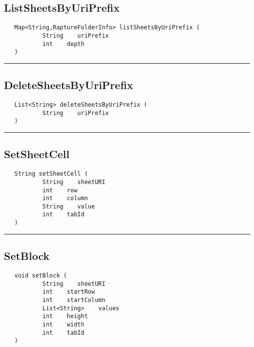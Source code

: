 \subsection{ListSheetsByUriPrefix}
\label{Api:ListSheetsByUriPrefix}
\begin{verbatim}
   Map<String,RaptureFolderInfo> listSheetsByUriPrefix (
           String    uriPrefix
           int    depth
   )
\end{verbatim}



\rule{15cm}{2pt}
\subsection{DeleteSheetsByUriPrefix}
\label{Api:DeleteSheetsByUriPrefix}
\begin{verbatim}
   List<String> deleteSheetsByUriPrefix (
           String    uriPrefix
   )
\end{verbatim}



\rule{15cm}{2pt}
\subsection{SetSheetCell}
\label{Api:SetSheetCell}
\begin{verbatim}
   String setSheetCell (
           String    sheetURI
           int    row
           int    column
           String    value
           int    tabId
   )
\end{verbatim}



\rule{15cm}{2pt}
\subsection{SetBlock}
\label{Api:SetBlock}
\begin{verbatim}
   void setBlock (
           String    sheetURI
           int    startRow
           int    startColumn
           List<String>    values
           int    height
           int    width
           int    tabId
   )
\end{verbatim}



